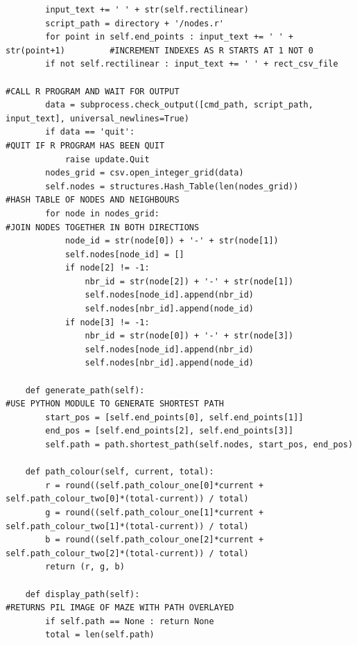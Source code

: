 \documentclass[titlepage]{article}
\begin{document}
\begin{changemargin}{-1in}{-1in}
\begin{verbatim}
        input_text += ' ' + str(self.rectilinear)
        script_path = directory + '/nodes.r'
        for point in self.end_points : input_text += ' ' + str(point+1)         #INCREMENT INDEXES AS R STARTS AT 1 NOT 0
        if not self.rectilinear : input_text += ' ' + rect_csv_file
                                                                                #CALL R PROGRAM AND WAIT FOR OUTPUT
        data = subprocess.check_output([cmd_path, script_path, input_text], universal_newlines=True)
        if data == 'quit':                                                      #QUIT IF R PROGRAM HAS BEEN QUIT
            raise update.Quit
        nodes_grid = csv.open_integer_grid(data)
        self.nodes = structures.Hash_Table(len(nodes_grid))                     #HASH TABLE OF NODES AND NEIGHBOURS
        for node in nodes_grid:                                                 #JOIN NODES TOGETHER IN BOTH DIRECTIONS
            node_id = str(node[0]) + '-' + str(node[1])
            self.nodes[node_id] = []
            if node[2] != -1:
                nbr_id = str(node[2]) + '-' + str(node[1])
                self.nodes[node_id].append(nbr_id)
                self.nodes[nbr_id].append(node_id)
            if node[3] != -1:
                nbr_id = str(node[0]) + '-' + str(node[3])
                self.nodes[node_id].append(nbr_id)
                self.nodes[nbr_id].append(node_id)

    def generate_path(self):                                                    #USE PYTHON MODULE TO GENERATE SHORTEST PATH
        start_pos = [self.end_points[0], self.end_points[1]]
        end_pos = [self.end_points[2], self.end_points[3]]
        self.path = path.shortest_path(self.nodes, start_pos, end_pos)

    def path_colour(self, current, total):
        r = round((self.path_colour_one[0]*current + self.path_colour_two[0]*(total-current)) / total)
        g = round((self.path_colour_one[1]*current + self.path_colour_two[1]*(total-current)) / total)
        b = round((self.path_colour_one[2]*current + self.path_colour_two[2]*(total-current)) / total)
        return (r, g, b)
    
    def display_path(self):                                                     #RETURNS PIL IMAGE OF MAZE WITH PATH OVERLAYED
        if self.path == None : return None
        total = len(self.path)


\end{verbatim}
\end{changemargin}
\end{document}
